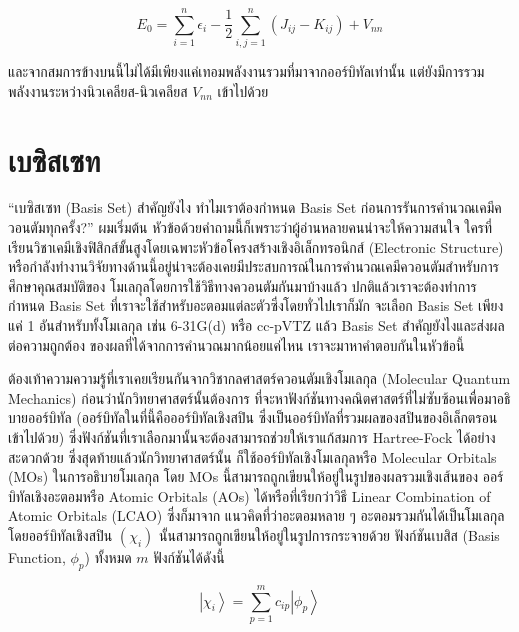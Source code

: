 \begin{equation}
    E_0
    =
    \sum_{i=1}^n \epsilon_i
    -\frac{1}{2} \sum_{i, j=1}^n\left(J_{i j}-K_{i j}\right)
    + V_{n n}
\end{equation}

\noindent และจากสมการข้างบนนี้ไม่ได้มีเพียงแค่เทอมพลังงานรวมที่มาจากออร์บิทัลเท่านั้น แต่ยังมีการรวมพลังงานระหว่างนิวเคลียส-นิวเคลียส
$V_{n n}$ เข้าไปด้วย

\section{เบซิสเซท}

\enquote{เบซิสเซท (Basis Set) สำคัญยังไง ทำไมเราต้องกำหนด Basis Set ก่อนการรันการคำนวณเคมีควอนตัมทุกครั้ง?} ผมเริ่มต้น%
หัวข้อด้วยคำถามนี้ก็เพราะว่าผู้อ่านหลายคนน่าจะให้ความสนใจ ใครที่เรียนวิชาเคมีเชิงฟิสิกส์ขั้นสูงโดยเฉพาะหัวข้อโครงสร้างเชิงอิเล็กทรอนิกส์
(Electronic Structure) หรือกำลังทำงานวิจัยทางด้านนี้อยู่น่าจะต้องเคยมีประสบการณ์ในการคำนวณเคมีควอนตัมสำหรับการศึกษาคุณสมบัติของ%
โมเลกุลโดยการใช้วิธีทางควอนตัมกันมาบ้างแล้ว ปกติแล้วเราจะต้องทำการกำหนด Basis Set ที่เราจะใช้สำหรับอะตอมแต่ละตัวซึ่งโดยทั่วไปเราก็มัก%
จะเลือก Basis Set เพียงแค่ 1 อันสำหรับทั้งโมเลกุล เช่น 6-31G(d) หรือ cc-pVTZ แล้ว Basis Set สำคัญยังไงและส่งผลต่อความถูกต้อง%
ของผลที่ได้จากการคำนวณมากน้อยแค่ไหน เราจะมาหาคำตอบกันในหัวข้อนี้

ต้องเท้าความความรู้ที่เราเคยเรียนกันจากวิชากลศาสตร์ควอนตัมเชิงโมเลกุล (Molecular Quantum Mechanics) ก่อนว่านักวิทยาศาสตร์นั้นต้องการ%
ที่จะหาฟังก์ชันทางคณิตศาสตร์ที่ไม่ซับซ้อนเพื่อมาอธิบายออร์บิทัล (ออร์บิทัลในที่นี้คือออร์บิทัลเชิงสปิน ซึ่งเป็นออร์บิทัลที่รวมผลของสปินของอิเล็กตรอน%
เข้าไปด้วย) ซึ่งฟังก์ชันที่เราเลือกมานั้นจะต้องสามารถช่วยให้เราแก้สมการ Hartree-Fock ได้อย่างสะดวกด้วย ซึ่งสุดท้ายแล้วนักวิทยาศาสตร์นั้น%
ก็ใช้ออร์บิทัลเชิงโมเลกุลหรือ Molecular Orbitals (MOs) ในการอธิบายโมเลกุล โดย MOs นี้สามารถถูกเขียนให้อยู่ในรูปของผลรวมเชิงเส้นของ%
ออร์บิทัลเชิงอะตอมหรือ Atomic Orbitals (AOs) ได้หรือที่เรียกว่าวิธี Linear Combination of Atomic Orbitals (LCAO) ซึ่งก็มาจาก%
แนวคิดที่ว่าอะตอมหลาย ๆ อะตอมรวมกันได้เป็นโมเลกุล โดยออร์บิทัลเชิงสปิน $(\chi_{i})$ นั้นสามารถถูกเขียนให้อยู่ในรูปการกระจายด้วย%
ฟังก์ชันเบสิส (Basis Function, $\phi_p$) ทั้งหมด $m$ ฟังก์ชันได้ดังนี้

\begin{equation}
    \label{eq:MO_LCAO}
    \left|\chi_i\right\rangle
    =
    \sum_{p=1}^m c_{i p}\left|\phi_p\right\rangle
\end{equation}

